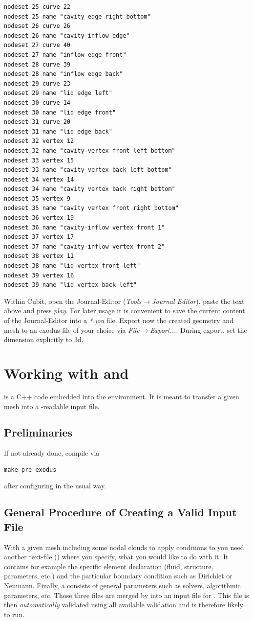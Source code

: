 \begin{small}
\begin{verbatim}
nodeset 25 curve 22
nodeset 25 name "cavity edge right bottom"
nodeset 26 curve 26
nodeset 26 name "cavity-inflow edge"
nodeset 27 curve 40
nodeset 27 name "inflow edge front"
nodeset 28 curve 39
nodeset 28 name "inflow edge back"
nodeset 29 curve 23
nodeset 29 name "lid edge left"
nodeset 30 curve 14
nodeset 30 name "lid edge front"
nodeset 31 curve 20
nodeset 31 name "lid edge back"
nodeset 32 vertex 12
nodeset 32 name "cavity vertex front left bottom"
nodeset 33 vertex 15
nodeset 33 name "cavity vertex back left bottom"
nodeset 34 vertex 14
nodeset 34 name "cavity vertex back right bottom"
nodeset 35 vertex 9
nodeset 35 name "cavity vertex front right bottom"
nodeset 36 vertex 19
nodeset 36 name "cavity-inflow vertex front 1"
nodeset 37 vertex 17
nodeset 37 name "cavity-inflow vertex front 2"
nodeset 38 vertex 11
nodeset 38 name "lid vertex front left"
nodeset 39 vertex 16
nodeset 39 name "lid vertex back left"

\end{verbatim} \end{small}

Within Cubit, open the Journal-Editor (\emph{Tools}$\to$\emph{Journal
Editor}), paste the text above and press \emph{play}. For later usage it is convenient
to save the current content of the Journal-Editor into a \emph{*.jou} file.
Export now the created geometry and mesh to an
exodus-file of your choice via \emph{File}$\to$\emph{Export...}.
During export, set the dimension explicitly to 3d.

\section{Working with \prexo and \baci{}}

\prexo is a C++ code embedded into the \baci{} environment. It is meant to
transfer a given mesh into a \baci{}-readable input file.

\subsection{Preliminaries}

If not already done, compile \prexo via \begin{verbatim}make pre_exodus\end{verbatim} after
configuring \baci{} in the usual way.

\subsection{General Procedure of Creating a Valid \baci{} Input File}
With a given mesh including some nodal clouds to apply conditions to you need
another text-file (\bc) where you specify, what you would like to do with
it. It contains for example the specific element declaration (fluid, structure,
parameters, etc.) and the particular boundary condition such as Dirichlet or
Neumann. Finally, a \head consists of general parameters such as
solvers, algorithmic parameters, etc. Those three files are merged by \prexo
into an input file for \baci{}. This file is then \emph{automatically} validated
using all available \baci{} validation and is therefore likely to run.

